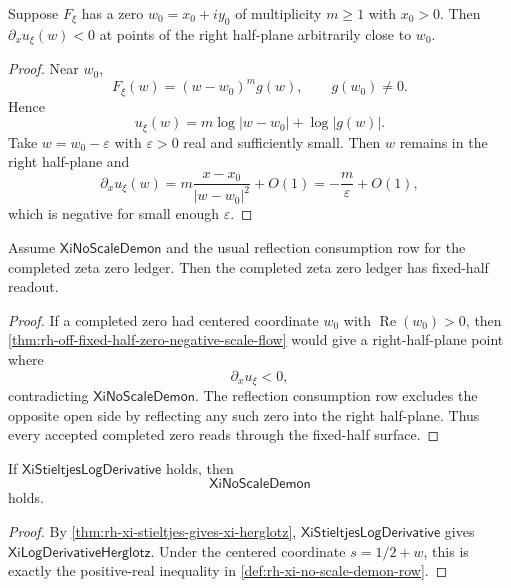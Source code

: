 \begin{theorem}
\label{thm:rh-off-fixed-half-zero-negative-scale-flow}
Suppose $F_\xi$ has a zero $w_0=x_0+iy_0$ of multiplicity $m\ge1$ with
$x_0>0$.  Then $\partial_xu_\xi(w)<0$ at points of the right half-plane
arbitrarily close to $w_0$.
\end{theorem}

\begin{proof}
Near $w_0$,
$$
F_\xi(w)=(w-w_0)^m g(w),
\qquad
g(w_0)\ne0.
$$
Hence
$$
u_\xi(w)=m\log|w-w_0|+\log|g(w)|.
$$
Take $w=w_0-\varepsilon$ with $\varepsilon>0$ real and sufficiently
small.  Then $w$ remains in the right half-plane and
$$
\partial_xu_\xi(w)
=
m\frac{x-x_0}{|w-w_0|^2}+O(1)
=
-\frac{m}{\varepsilon}+O(1),
$$
which is negative for small enough $\varepsilon$.
\end{proof}

\begin{theorem}
\label{thm:rh-xi-no-scale-demon-fixed-half-readout}
Assume $\mathsf{XiNoScaleDemon}$ and the usual reflection consumption row
for the completed zeta zero ledger.  Then the completed zeta zero ledger
has fixed-half readout.
\end{theorem}

\begin{proof}
If a completed zero had centered coordinate $w_0$ with
$\operatorname{Re}(w_0)>0$, then
\autoref{thm:rh-off-fixed-half-zero-negative-scale-flow} would give a
right-half-plane point where
$$
\partial_xu_\xi<0,
$$
contradicting $\mathsf{XiNoScaleDemon}$.  The reflection consumption row
excludes the opposite open side by reflecting any such zero into the
right half-plane.  Thus every accepted completed zero reads through the
fixed-half surface.
\end{proof}

\begin{theorem}
\label{thm:rh-stieltjes-supplies-no-scale-demon}
If $\mathsf{XiStieltjesLogDerivative}$ holds, then
$$
\mathsf{XiNoScaleDemon}
$$
holds.
\end{theorem}

\begin{proof}
By \autoref{thm:rh-xi-stieltjes-gives-xi-herglotz},
$\mathsf{XiStieltjesLogDerivative}$ gives
$\mathsf{XiLogDerivativeHerglotz}$.  Under the centered coordinate
$s=1/2+w$, this is exactly the positive-real inequality in
\autoref{def:rh-xi-no-scale-demon-row}.
\end{proof}

